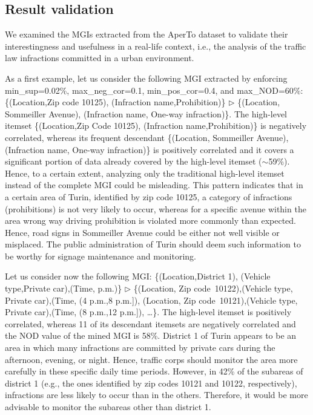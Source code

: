\subsection{Result validation}
\label{validation}

We examined the MGIs extracted from the AperTo dataset to validate their interestingness and usefulness in a real-life context, 
i.e., the analysis of the traffic law infractions committed in a urban environment.

As a first example, let us consider the following MGI extracted by enforcing min\_sup=0.02\%, max\_neg\_cor=0.1, min\_pos\_cor=0.4, and max\_NOD=60\%:
\{(Location,Zip code 10125), (Infraction name,Prohibition)\} $\triangleright$ \{(Location, Sommeiller Avenue), (Infraction name, One-way infraction)\}.
The high-level itemset \{(Location,Zip Code 10125), (Infraction name,Prohibition)\} is negatively correlated, whereas its frequent descendant \{(Location, Sommeiller Avenue), (Infraction name, One-way infraction)\} is positively correlated
and it covers a significant portion of data already covered by the high-level itemset ($\sim$59\%). Hence, to a certain extent, analyzing only 
the traditional high-level itemset instead of the complete MGI could be misleading.
This pattern indicates that in a certain area of Turin, identified by zip code 10125, a category of infractions (prohibitions) is not very likely to occur, 
whereas for a specific avenue within the area wrong way driving prohibition is violated more commonly than expected. Hence, road signs in Sommeiller Avenue could be either not well visible or misplaced. 
The public administration of Turin should deem such information to be worthy for signage maintenance and monitoring.

Let us consider now the following MGI: \{(Location,District 1), (Vehicle type,Private car),(Time, p.m.)\} $\triangleright$ \{(Location, Zip code~10122),(Vehicle type, Private car),(Time, (4 p.m.,8 p.m.]), (Location, Zip code~10121),(Vehicle type, Private car),(Time, (8 p.m.,12 p.m.]), \dots \}.
The high-level itemset is positively correlated, whereas 11 of its descendant itemsets are negatively correlated and the NOD value of the mined MGI is 58\%.
District 1 of Turin appears to be an area in which many infractions are committed by private cars during the afternoon, evening, or night. Hence, traffic corps should monitor the area more carefully in these specific daily time periods.
However, in 42\% of the subareas of district 1 (e.g., the ones identified by zip codes 10121 and 10122, respectively), infractions are less likely to occur than in the others. 
Therefore, it would be more advisable to monitor the subareas other than district 1. 

